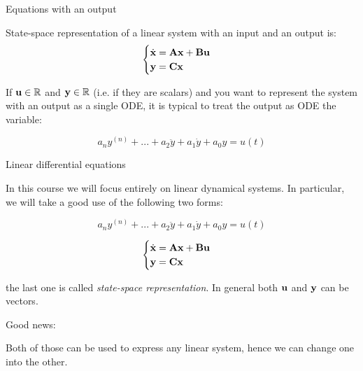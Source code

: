 \documentclass{beamer}
\begin{document}
\begin{frame}{Equations with an output}
	\begin{flushleft}
		
		State-space representation of a linear system with an input and an output is:
		\begin{equation}
		\begin{cases}
				\dot{\mathbf{x}} = \mathbf{A} \mathbf{x} + \mathbf{B}\mathbf{u} \\
				\mathbf{y} = \mathbf{C}\mathbf{x}
		\end{cases}
		\end{equation}
		
		If $\mathbf{u} \in \mathbb{R}$ and $\mathbf{y} \in \mathbb{R}$ (i.e. if they are scalars) and you want to represent the system with an output as a single ODE, it is typical to treat the output as ODE the variable:
		
		\begin{equation}
			a_n y^{(n)} + 
			... +
			a_2 \ddot{y} + a_1 \dot{y} + 
			a_0 y = u(t)
		\end{equation}
		
	\end{flushleft}
\end{frame}






\begin{frame}{Linear differential equations}
\begin{flushleft}

In this course we will focus entirely on linear dynamical systems. In particular, we will take a good use of the following two forms:

\begin{equation}
    a_n y^{(n)} +
    ... +
    a_2 \ddot{y} + a_1 \dot{y} + 
    a_0 y = u(t)
\end{equation}

\begin{equation}
	\begin{cases}
		\dot{\mathbf{x}} = \mathbf{A} \mathbf{x} + \mathbf{B}\mathbf{u} \\
		\mathbf{y} = \mathbf{C}\mathbf{x}
	\end{cases}
\end{equation}

the last one is called \emph{state-space representation}. In general both $\mathbf{u}$ and $\mathbf{y}$ can be vectors.

\begin{exampleblock}{Good news:}

\hfill \break
Both of those can be used to express any linear system, hence we can change one into the other.
\newline

\end{exampleblock}

\end{flushleft}
\end{frame}
\end{document}
